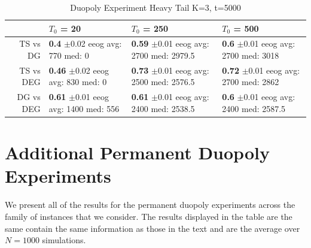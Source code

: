 \documentclass[11pt,letterpaper]{article}
\begin{document}
\begin{table}[H]
\centering
\caption{Duopoly Experiment Heavy Tail K=3, t=5000} 
\begin{tabular}{rlll}
  \hline
 & $T_0$ = 20 & $T_0$ = 250 & $T_0$ = 500 \\ 
  \hline
TS vs DG & \makecell{\textbf{0.4} $\pm$0.02\\ eeog \\ avg: 770\\ med: 0} & \makecell{\textbf{0.59} $\pm$0.01\\ eeog \\ avg: 2700\\ med: 2979.5} & \makecell{\textbf{0.6} $\pm$0.01\\ eeog \\ avg: 2700\\ med: 3018} \\ 
  TS vs DEG & \makecell{\textbf{0.46} $\pm$0.02\\ eeog \\ avg: 830\\ med: 0} & \makecell{\textbf{0.73} $\pm$0.01\\ eeog \\ avg: 2500\\ med: 2576.5} & \makecell{\textbf{0.72} $\pm$0.01\\ eeog \\ avg: 2700\\ med: 2862} \\ 
  DG vs DEG & \makecell{\textbf{0.61} $\pm$0.01\\ eeog \\ avg: 1400\\ med: 556} & \makecell{\textbf{0.61} $\pm$0.01\\ eeog \\ avg: 2400\\ med: 2538.5} & \makecell{\textbf{0.6} $\pm$0.01\\ eeog \\ avg: 2400\\ med: 2587.5} \\ 
   \hline
\end{tabular}
\end{table}

\section{Additional Permanent Duopoly Experiments}

We present all of the results for the permanent duopoly experiments across the family of instances that we consider. The results displayed in the table are the same contain the same information as those in the text and are the average over $N = 1000$ simulations.
\end{document}
